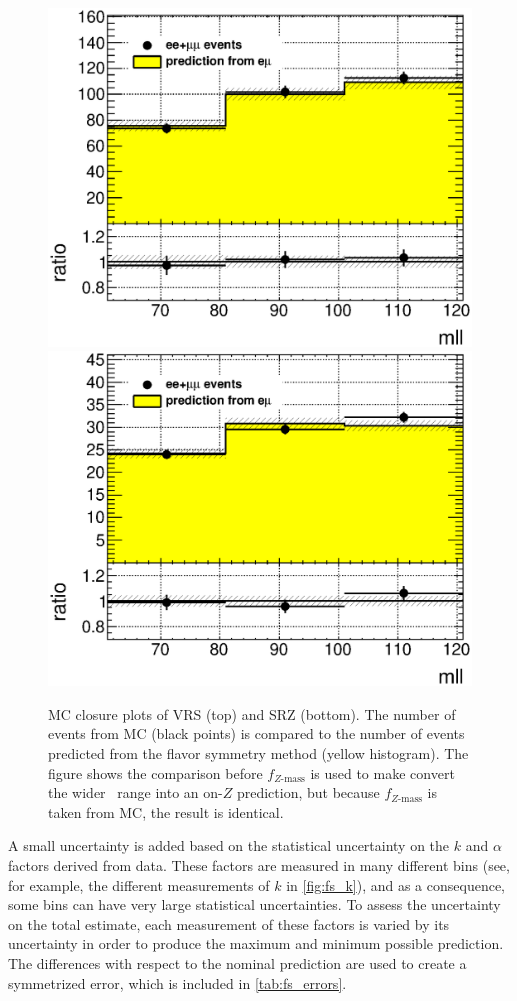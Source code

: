 \begin{centering}
\begin{figure}[!hbt]
\myfloatalign
\includegraphics[width=.85\linewidth]{figures/fs/ee+mm_ratio_mll_VRZ_widened.eps}
\includegraphics[width=.85\linewidth]{figures/fs/ee+mm_ratio_mll_SRZ_widened.eps}
\caption{\ac{MC} closure plots of VRS (top) and SRZ (bottom). The number of events from MC (black points) is compared to the number of events predicted from the flavor symmetry method (yellow histogram). The figure shows the comparison before $f_{Z \mathrm{\text{-}mass}}$ is used to make convert the wider \mll~range into an on-$Z$ prediction, but because $f_{Z \mathrm{\text{-}mass}}$ is taken from \ac{MC}, the result is identical.}
\label{fig:fs_closure}
\end{figure}
\end{centering}

A small uncertainty is added based on the statistical uncertainty on the $k$ and $\alpha$ factors derived from data. These factors are measured in many different bins (see, for example, the different measurements of $k$ in \autoref{fig:fs_k}), and as a consequence, some bins can have very large statistical uncertainties. To assess the uncertainty on the total estimate, each measurement of these factors is varied by its uncertainty in order to produce the maximum and minimum possible prediction. The differences with respect to the nominal prediction are used to create a symmetrized error, which is included in \autoref{tab:fs_errors}.

